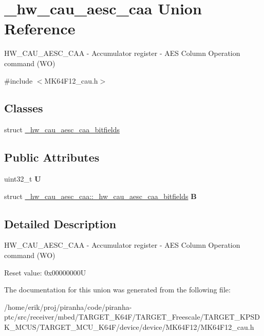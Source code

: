 \hypertarget{union__hw__cau__aesc__caa}{}\section{\+\_\+hw\+\_\+cau\+\_\+aesc\+\_\+caa Union Reference}
\label{union__hw__cau__aesc__caa}


H\+W\+\_\+\+C\+A\+U\+\_\+\+A\+E\+S\+C\+\_\+\+C\+AA -\/ Accumulator register -\/ A\+ES Column Operation command (WO)  




{\ttfamily \#include $<$M\+K64\+F12\+\_\+cau.\+h$>$}

\subsection*{Classes}
\begin{DoxyCompactItemize}
\item 
struct \hyperlink{struct__hw__cau__aesc__caa_1_1__hw__cau__aesc__caa__bitfields}{\+\_\+hw\+\_\+cau\+\_\+aesc\+\_\+caa\+\_\+bitfields}
\end{DoxyCompactItemize}
\subsection*{Public Attributes}
\begin{DoxyCompactItemize}
\item 
uint32\+\_\+t {\bfseries U}\hypertarget{union__hw__cau__aesc__caa_a02d5d440a35a81127b0e3c2717125afe}{}\label{union__hw__cau__aesc__caa_a02d5d440a35a81127b0e3c2717125afe}

\item 
struct \hyperlink{struct__hw__cau__aesc__caa_1_1__hw__cau__aesc__caa__bitfields}{\+\_\+hw\+\_\+cau\+\_\+aesc\+\_\+caa\+::\+\_\+hw\+\_\+cau\+\_\+aesc\+\_\+caa\+\_\+bitfields} {\bfseries B}\hypertarget{union__hw__cau__aesc__caa_a90205fe9219cd0ce91947a3eda732a58}{}\label{union__hw__cau__aesc__caa_a90205fe9219cd0ce91947a3eda732a58}

\end{DoxyCompactItemize}


\subsection{Detailed Description}
H\+W\+\_\+\+C\+A\+U\+\_\+\+A\+E\+S\+C\+\_\+\+C\+AA -\/ Accumulator register -\/ A\+ES Column Operation command (WO) 

Reset value\+: 0x00000000U 

The documentation for this union was generated from the following file\+:\begin{DoxyCompactItemize}
\item 
/home/erik/proj/piranha/code/piranha-\/ptc/src/receiver/mbed/\+T\+A\+R\+G\+E\+T\+\_\+\+K64\+F/\+T\+A\+R\+G\+E\+T\+\_\+\+Freescale/\+T\+A\+R\+G\+E\+T\+\_\+\+K\+P\+S\+D\+K\+\_\+\+M\+C\+U\+S/\+T\+A\+R\+G\+E\+T\+\_\+\+M\+C\+U\+\_\+\+K64\+F/device/device/\+M\+K64\+F12/M\+K64\+F12\+\_\+cau.\+h\end{DoxyCompactItemize}
